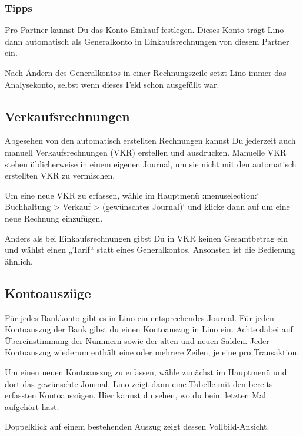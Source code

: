 \documentclass[letterpaper,10pt,ngerman]{sphinxmanual}
\begin{document}
\subsubsection*{Tipps}

Pro Partner kannst Du das Konto Einkauf festlegen. Dieses Konto trägt
Lino dann automatisch als Generalkonto in Einkaufsrechnungen von
diesem Partner ein.

Nach Ändern des Generalkontos in einer Rechnungszeile setzt Lino immer
das Analysekonto, selbst wenn dieses Feld schon ausgefüllt war.


\subsection{Verkaufsrechnungen}
\label{\detokenize{sek/ledger:verkaufsrechnungen}}
Abgesehen von den automatisch erstellten Rechnungen kannst Du
jederzeit auch manuell Verkaufsrechnungen (VKR) erstellen und
ausdrucken. Manuelle VKR stehen üblicherweise in einem eigenen
Journal, um sie nicht mit den automatisch erstellten VKR zu
vermischen.

Um eine neue VKR zu erfassen, wähle im Hauptmenü :menuselection:{}`
Buchhaltung \textendash{}\textgreater{} Verkauf \textendash{}\textgreater{} (gewünschtes Journal){}` und klicke dann auf
 um eine neue Rechnung einzufügen.

Anders als bei Einkaufsrechnungen gibst Du in VKR keinen Gesamtbetrag
ein und wählst einen „Tarif“ statt eines Generalkontos. Ansonsten ist
die Bedienung ähnlich.


\subsection{Kontoauszüge}
\label{\detokenize{sek/ledger:kontoauszuge}}
Für jedes Bankkonto gibt es in Lino ein entsprechendes Journal. Für
jeden Kontoauszug der Bank gibst du einen Kontoauszug in Lino
ein. Achte dabei auf Übereinstimmung der Nummern sowie der alten und
neuen Salden. Jeder Kontoauszug wiederum enthält eine oder mehrere
Zeilen, je eine pro Transaktion.

Um einen neuen Kontoauszug zu erfassen, wähle zunächst im Hauptmenü
 und dort das
gewünschte Journal. Lino zeigt dann eine Tabelle mit den bereits
erfassten Kontoauszügen. Hier kannst du sehen, wo du beim letzten Mal
aufgehört hast.

Doppelklick auf einem bestehenden Auszug zeigt dessen
Vollbild-Ansicht.
\end{document}
